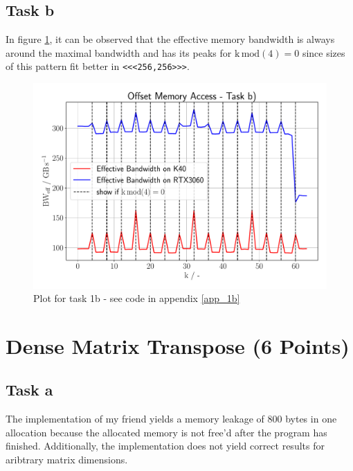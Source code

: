 \subsection{Task b}
In figure \ref{task_1_b_plot}, it can be observed that the effective memory bandwidth is 
always around the maximal bandwidth and has its peaks for $ \mathrm{k} \, \mathrm{mod}(4) = 0$
since sizes of this pattern fit better in \texttt{<<<256,256>>>}.
\begin{figure}[h]
    \begin{center}
        \includegraphics[width=1\textwidth]{figures/task_1_b.pdf}
        \caption{Plot for task 1b - see code in appendix \ref{app_1b}}
        \label{task_1_b_plot}
    \end{center}
\end{figure} 
\pagebreak


\section{Dense Matrix Transpose (6 Points)}
\subsection{Task a}
The implementation of my friend yields a memory leakage of 800 bytes in one allocation
because the allocated memory is not free'd after the program has finished. Additionally, 
the implementation does not yield correct results for aribtrary matrix dimensions.


